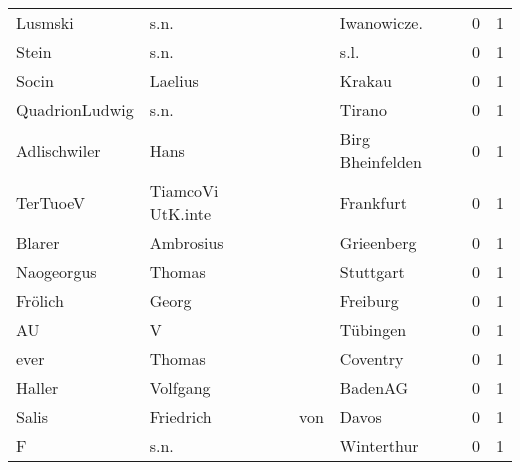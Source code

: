 \begin{tabular}{llllrr}
                  Lusmski &                               s.n. &             &                                Iwanowicze.  &          0 &         1 \\
                    Stein &                               s.n. &             &                                        s.l. &          0 &         1 \\
                    Socin &                            Laelius &             &                                      Krakau &          0 &         1 \\
           QuadrionLudwig &                               s.n. &             &                                      Tirano &          0 &         1 \\
             Adlischwiler &                               Hans &             &                            Birg Bheinfelden &          0 &         1 \\
                 TerTuoeV &                  TiamcoVi UtK.inte &             &                                   Frankfurt &          0 &         1 \\
                   Blarer &                          Ambrosius &             &                                  Grieenberg &          0 &         1 \\
               Naogeorgus &                             Thomas &             &                                   Stuttgart &          0 &         1 \\
                  Frölich &                              Georg &             &                                    Freiburg &          0 &         1 \\
                       AU &                                  V &             &                                    Tübingen &          0 &         1 \\
                     ever &                             Thomas &             &                                    Coventry &          0 &         1 \\
                   Haller &                           Volfgang &             &                                     BadenAG &          0 &         1 \\
                    Salis &                          Friedrich &         von &                                       Davos &          0 &         1 \\
                        F &                               s.n. &             &                                  Winterthur &          0 &         1 \\

\end{tabular}
